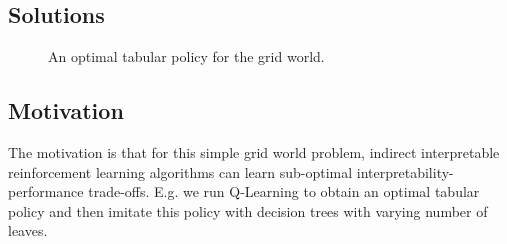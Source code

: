 \subsection{Solutions}

\begin{figure}[ht]
\centering
{}
\caption{An optimal tabular policy for the grid world.}\label{fig:optimal-policy}
\end{figure}


\subsection{Motivation}
The motivation is that for this simple grid world problem, indirect interpretable reinforcement learning algorithms can learn sub-optimal interpretability-performance trade-offs. E.g. we run Q-Learning to obtain an optimal tabular policy and then imitate this policy with decision trees with varying number of leaves. 

